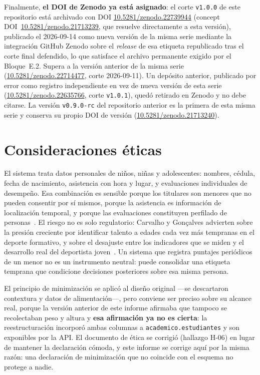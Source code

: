 \documentclass[11pt,a4paper]{article}
\begin{document}
Finalmente, \textbf{el DOI de Zenodo ya está asignado}: el corte
\texttt{v1.0.0} de este repositorio está archivado con DOI
\href{https://doi.org/10.5281/zenodo.22739944}{10.5281/zenodo.22739944}
(concept DOI~\href{https://doi.org/10.5281/zenodo.21713239}{10.5281/zenodo.21713239},
que resuelve directamente a esta versión), publicado el 2026-09-14 como
nueva versión de la misma serie mediante la integración
GitHub\,\textrightarrow\,Zenodo sobre el \emph{release} de esa etiqueta
republicado tras el corte final defendido, lo que
satisface el archivo permanente exigido por el Bloque~E.2. Supera a la
versión anterior de la misma serie
(\href{https://doi.org/10.5281/zenodo.22714477}{10.5281/zenodo.22714477},
corte 2026-09-11). Un depósito anterior, publicado por error como
registro independiente en vez de nueva versión de esta serie
(\href{https://doi.org/10.5281/zenodo.22635766}{10.5281/zenodo.22635766},
corte \texttt{v1.0.1}), quedó retirado en Zenodo y no debe citarse. La
versión \texttt{v0.9.0-rc} del repositorio anterior es la primera de esta
misma serie y conserva su propio DOI de versión
(\href{https://doi.org/10.5281/zenodo.21713240}{10.5281/zenodo.21713240}).

\section{Consideraciones éticas}
\label{sec:etica}

El sistema trata datos personales de niños, niñas y adolescentes: nombres,
cédula, fecha de nacimiento, asistencia con hora y lugar, y evaluaciones
individuales de desempeño. Esa combinación es sensible porque los titulares
son menores que no pueden consentir por sí mismos, porque la asistencia es
información de localización temporal, y porque las evaluaciones constituyen
perfilado de personas~\cite{lopdp2021,acm2018}. El riesgo no es solo
regulatorio: Carvalho y Gonçalves advierten sobre la presión creciente por
identificar talento a edades cada vez más tempranas en el deporte
formativo, y sobre el desajuste entre los indicadores que se miden y el
desarrollo real del deportista
joven~\cite{carvalho2023talento}. Un sistema que registra
puntajes periódicos de un menor no es un instrumento neutral: puede
consolidar una etiqueta temprana que condicione decisiones posteriores
sobre esa misma persona.

El principio de minimización se aplicó al diseño original —se descartaron
contextura y datos de alimentación—, pero conviene ser preciso sobre su
alcance real, porque la versión anterior de este informe afirmaba que
tampoco se recolectaban peso y altura y \textbf{esa afirmación ya no es
cierta}: la reestructuración incorporó ambas columnas a
\texttt{academico.estudiantes} y son exponibles por la API. El documento de
ética se corrigió (hallazgo H-06) en lugar de mantener la declaración
cómoda, y este informe se corrige aquí por la misma razón: una declaración
de minimización que no coincide con el esquema no protege a nadie.
\end{document}
